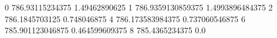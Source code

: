 0 786.93115234375 1.49462890625
1 786.9359130859375 1.4993896484375
2 786.1845703125 0.748046875
4 786.173583984375 0.737060546875
6 785.901123046875 0.464599609375
8 785.4365234375 0.0
